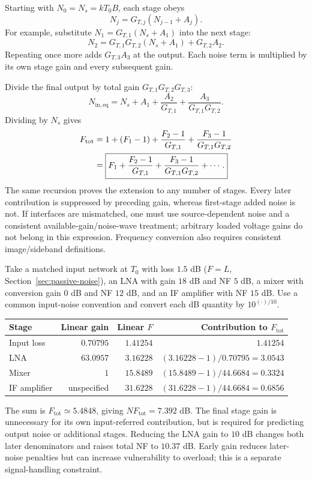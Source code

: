 Starting with $N_0=N_s=kT_0B$, each stage obeys
\[
N_j=G_{T,j}(N_{j-1}+A_j).
\]
For example, substitute $N_1=G_{T,1}(N_s+A_1)$ into the next stage:
\[
N_2=G_{T,1}G_{T,2}(N_s+A_1)+G_{T,2}A_2.
\]
Repeating once more adds $G_{T,3}A_3$ at the output. Each noise term is multiplied by its own stage gain and every subsequent gain.

Divide the final output by total gain $G_{T,1}G_{T,2}G_{T,3}$:
\[
N_{\mathrm{in,eq}}=N_s+A_1+\frac{A_2}{G_{T,1}}+\frac{A_3}{G_{T,1}G_{T,2}}.
\]
Dividing by $N_s$ gives
\begin{align}
F_{\mathrm{tot}}
&=1+(F_1-1)+\frac{F_2-1}{G_{T,1}}+\frac{F_3-1}{G_{T,1}G_{T,2}}\notag\\
&=\boxed{F_1+\frac{F_2-1}{G_{T,1}}+\frac{F_3-1}{G_{T,1}G_{T,2}}+\cdots.}
\end{align}
The same recursion proves the extension to any number of stages. Every later contribution is suppressed by preceding gain, whereas first-stage added noise is not. If interfaces are mismatched, one must use source-dependent noise and a consistent available-gain/noise-wave treatment; arbitrary loaded voltage gains do not belong in this expression. Frequency conversion also requires consistent image/sideband definitions.

\begin{example}[breakable=false,title={Noise figure of a receiver cascade}]
Take a matched input network at $T_0$ with loss $1.5$ dB ($F=L$, Section~\ref{sec:passive-noise}), an LNA with gain $18$ dB and NF $5$ dB, a mixer with conversion gain $0$ dB and NF $12$ dB, and an IF amplifier with NF $15$ dB. Use a common input-noise convention and convert each dB quantity by $10^{(\cdot)/10}$.
\begin{center}\begin{tabular}{lrrr}\toprule
Stage & Linear gain & Linear $F$ & Contribution to $F_{\mathrm{tot}}$\\\midrule
Input loss & $0.70795$ & $1.41254$ & $1.41254$\\
LNA & $63.0957$ & $3.16228$ & $(3.16228-1)/0.70795=3.0543$\\
Mixer & $1$ & $15.8489$ & $(15.8489-1)/44.6684=0.3324$\\
IF amplifier & unspecified & $31.6228$ & $(31.6228-1)/44.6684=0.6856$\\\bottomrule
\end{tabular}\end{center}
The sum is $F_{\mathrm{tot}}\simeq5.4848$, giving $NF_{\mathrm{tot}}=7.392$ dB. The final stage gain is unnecessary for its own input-referred contribution, but is required for predicting output noise or additional stages. Reducing the LNA gain to $10$ dB changes both later denominators and raises total NF to $10.37$ dB. Early gain reduces later-noise penalties but can increase vulnerability to overload; this is a separate signal-handling constraint.
\end{example}

